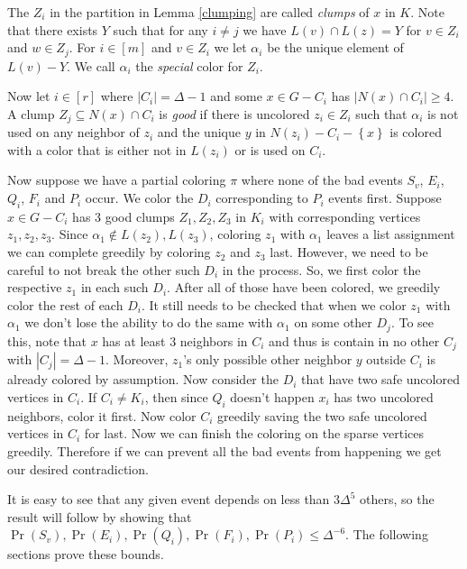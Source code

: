 \documentclass[12pt]{amsart}
\theoremstyle{plain}
\theoremstyle{definition}
\theoremstyle{remark}
\newcommand{\set}[1]{\left\{ #1 \right\}}
\newcommand{\card}[1]{\left|#1\right|}
\newcommand{\irange}[1]{\left[#1\right]}
\begin{document}
The $Z_i$ in the partition in Lemma \ref{clumping} are called \emph{clumps} of $x$ in $K$.
Note that there exists $Y$ such that for any $i \neq j$ we have $L(v) \cap L(z)
= Y$ for $v \in Z_i$ and $w \in Z_j$.  For $i \in \irange{m}$ and $v \in Z_i$ we
let $\alpha_i$ be the unique element of $L(v) - Y$.  We call $\alpha_i$ the
\emph{special} color for $Z_i$.

Now let $i \in \irange{r}$ where $\card{C_i} = \Delta - 1$ and some $x \in G -
C_i$ has $\card{N(x) \cap C_i} \geq 4$. A clump $Z_j \subseteq
N(x) \cap C_i$ is \emph{good} if there is uncolored $z_i \in Z_i$ such that
$\alpha_i$ is not used on any neighbor of $z_i$ and the unique $y$ in $N(z_i) - C_i - \set{x}$ is colored with a color that is
either not in $L(z_i)$ or is used on $C_i$.

Now suppose we have a partial coloring $\pi$ where none of the bad events $S_v$,
$E_i$, $Q_i$, $F_i$ and $P_i$ occur.  We color the $D_i$ corresponding to $P_i$
events first.  Suppose $x \in G - C_i$ has $3$ good clumps $Z_1, Z_2, Z_3$ in $K_i$ with
corresponding vertices $z_1, z_2, z_3$.  Since $\alpha_1 \not \in L(z_2),
L(z_3)$, coloring $z_1$ with $\alpha_1$ leaves a list assignment we can complete
greedily by coloring $z_2$ and $z_3$ last.  However, we need to be careful
to not break the other such $D_i$ in the process.  So, we first color the
respective $z_1$ in each such $D_i$.  After all of those have been colored, we
greedily color the rest of each $D_i$.  
It still needs to be checked that when we color $z_1$ with $\alpha_1$ we don't lose the ability to do the same 
with $\alpha_1$ on some other $D_j$. To see this, note that $x$ has at least $3$ neighbors in $C_i$ and thus is 
contain in no other $C_j$ with $\card{C_j} = \Delta-1$.  Moreover, $z_1$'s only
possible other neighbor $y$ outside $C_i$ is already colored by assumption. 
Now consider the $D_i$ that have two safe uncolored vertices in $C_i$.  If $C_i
\neq K_i$, then since $Q_i$ doesn't happen $x_i$ has two uncolored neighbors,
color it first.  Now color $C_i$ greedily saving the two safe uncolored vertices
in $C_i$ for last. Now we can finish the coloring on the sparse vertices greedily. 
Therefore if we can prevent all the bad events from happening we get our desired contradiction.

It is easy to see that any given event depends on less than $3\Delta^5$ others,
so the result will follow by showing that $\Pr(S_v), \Pr(E_i), \Pr(Q_i),
\Pr(F_i),\Pr(P_i) \leq \Delta^{-6}$.  The following sections prove these bounds.
\end{document}
